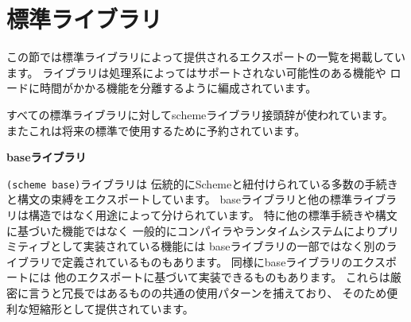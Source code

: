 \chapter{標準ライブラリ}
\label{stdlibraries}


この節では標準ライブラリによって提供されるエクスポートの一覧を掲載しています。
ライブラリは処理系によってはサポートされない可能性のある機能や
ロードに時間がかかる機能を分離するように編成されています。

すべての標準ライブラリに対して{\cf scheme}ライブラリ接頭辞が使われています。
またこれは将来の標準で使用するために予約されています。

\textbf{baseライブラリ}

\texttt{(scheme base)}ライブラリは
伝統的にSchemeと紐付けられている多数の手続きと構文の束縛をエクスポートしています。
baseライブラリと他の標準ライブラリは構造ではなく用途によって分けられています。
特に他の標準手続きや構文に基づいた機能ではなく
一般的にコンパイラやランタイムシステムによりプリミティブとして実装されている機能には
baseライブラリの一部ではなく別のライブラリで定義されているものもあります。
同様にbaseライブラリのエクスポートには
他のエクスポートに基づいて実装できるものもあります。
これらは厳密に言うと冗長ではあるものの共通の使用パターンを捕えており、
そのため便利な短縮形として提供されています。

